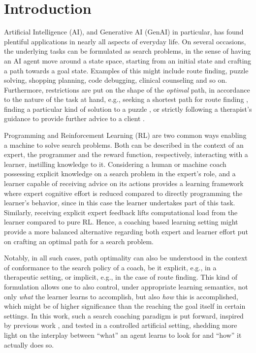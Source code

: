 \documentclass[a4paper,twoside]{article}
\begin{document}
\section{Introduction}\label{sec:introduction}
%
Artificial Intelligence (AI), and Generative AI (GenAI) in particular, has found plentiful applications in nearly all aspects of everyday life. On several occasions, the underlying tasks can be formulated as search problems, in the sense of having an AI agent move around a state space, starting from an initial state and crafting a path towards a goal state. Examples of this might include route finding, puzzle solving, shopping planning, code debugging, clinical counseling and so on. Furthermore, restrictions are put on the shape of the \emph{optimal} path, in accordance to the nature of the task at hand, e.g., seeking a shortest path for route finding \cite{liu1996intelligent,migel2024optimal}, finding a particular kind of solution to a puzzle \cite{mutalova2023}, or strictly following a therapist's guidance to provide further advice to a client \cite{sedlakova2023,fiske2019}.

Programming and Reinforcement Learning (RL) are two common ways enabling a machine to solve search problems. Both can be described in the context of an expert, the programmer and the reward function, respectively, interacting with a learner, instilling knowledge to it. Considering a human or machine coach possessing explicit knowledge on a search problem in the expert's role, and a learner capable of receiving advice on its actions provides a learning framework where expert cognitive effort is reduced compared to directly programming the learner's behavior, since in this case the learner undertakes part of this task. Similarly, receiving explicit expert feedback lifts computational load from the learner compared to pure RL. Hence, a coaching based learning setting might provide a more balanced alternative regarding both expert and learner effort put on crafting an optimal path for a search problem.

Notably, in all such cases, path optimality can also be understood in the context of conformance to the search policy of a coach, be it explicit, e.g., in a therapeutic setting, or implicit, e.g., in the case of route finding. This kind of formulation allows one to also control, under appropriate learning semantics, not only \emph{what} the learner learns to accomplish, but also \emph{how} this is accomplished, which might be of higher significance than the reaching the goal itself in certain settings. In this work, such a search coaching paradigm is put forward, inspired by previous work \cite{michaelMachineCoaching2019,prudens2022}, and tested in a controlled artificial setting, shedding more light on the interplay between ``what'' an agent learns to look for and ``how'' it actually does so.
%
%
%
\end{document}
